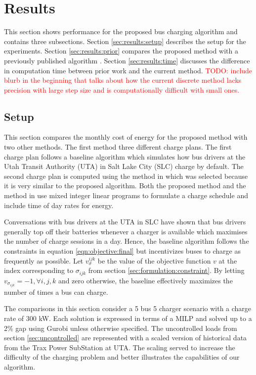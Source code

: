 \section{Results\label{sec:results}}
This section shows performance for the proposed bus charging algorithm and contains three subsections. Section \ref{sec:results:setup} describes the setup for the experiments. Section \ref{sec:results:prior} compares the proposed method with a previously published algorithm \cite{He_2019_Fast}. Section \ref{sec:results:time} discusses the difference in computation time between prior work and the current method.
\textcolor{red}{TODO: include blurb in the beginning that talks about how the current discrete method lacks precision with large step size and is computationally difficult with small ones.}
\subsection{Setup\label{sec:results:setup}}
This section compares the monthly cost of energy for the proposed method with two other methods. The first method three different charge plans.  The first charge plan follows a baseline algorithm which simulates how bus drivers at the Utah Transit Authority (UTA) in Salt Lake City (SLC) charge by default. The second charge plan is computed using the method in \cite{He_2019_Fast} which was selected because it is very similar to the proposed algorithm.  Both the proposed method and the method in \cite{He_2019_Fast} use mixed integer linear programs to formulate a charge schedule and include time of day rates for energy. 
\par Conversations with bus drivers at the UTA in SLC have shown that bus drivers generally top off their batteries whenever a charger is available which maximises the number of charge sessions in a day. Hence, the baseline algorithm follows the constraints in equation \ref{eqn:objective:final} but incentivizes buses to charge as frequently as possible. Let $v_{\sigma}^{ijk}$ be the value of the objective function $v$ at the index corresponding to $\sigma_{ijk}$ from section \ref{sec:formulation:constraint}. By letting $v_{\sigma_{ijk}} = -1, \forall i,j,k$ and zero otherwise, the baseline effectively maximizes the number of times a bus can charge. 
\par The comparisons in this section consider a 5 bus 5 charger scenario with a charge rate of 300 kW. Each solution is expressed in terms of a MILP and solved up to a 2\% gap using Gurobi \cite{gurobi} unless otherwise specified. The uncontrolled loads from section \ref{sec:uncontrolled} are represented with a scaled version of historical data from the Trax Power SubStation at UTA. The scaling served to increase the difficulty of the charging problem and better illustrates the capabilities of our algorithm. 

